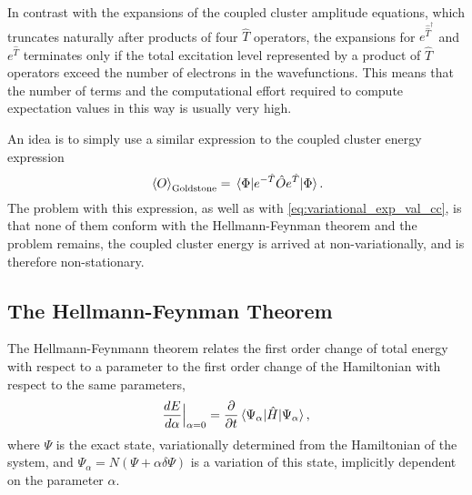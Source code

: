 In contrast with the expansions of the coupled cluster amplitude equations, which 
truncates naturally after products of four $\hat{T}$ operators, the expansions for 
$e^{\hat{\hat{T}}^\dagger}$ and $e^{\hat{T}}$ terminates only if the total excitation 
level represented by a product of $\hat{T}$ operators exceed the number of electrons in 
the wavefunctions. This means that the number of terms and the computational effort
required to compute expectation values in this way is usually very high.

An idea is to simply use a similar expression to the coupled cluster energy
expression
\begin{equation}
    \ev*{O}_{\text{Goldstone}} = \mel{\Phi}{e^{-\hat{T}}\hat{O}e^{\hat{T}}}{\Phi}.
\end{equation}
The problem with this expression, as well as with \autoref{eq:variational_exp_val_cc},
is that none of them conform with the Hellmann-Feynman theorem and the problem remains,
the coupled cluster energy is arrived at non-variationally, and is therefore non-stationary.

\subsection{The Hellmann-Feynman Theorem}

The Hellmann-Feynmann\cite{feynman1939forces} theorem relates the first order change of total energy 
with respect to a parameter to the first order change of the Hamiltonian with 
respect to the same parameters,
\begin{equation}
    \frac{d E}{d\alpha}\Big\lvert_{\alpha=0} = 
    \frac{\partial}{\partial t}\mel{\Psi_\alpha}{\hat{H}}{\Psi_\alpha},
\end{equation}
where $\Psi$ is the exact state, variationally determined from the Hamiltonian of the 
system, and $\Psi_\alpha = N(\Psi + \alpha \delta\Psi)$ is a variation of this state,
implicitly dependent on the parameter $\alpha$.

